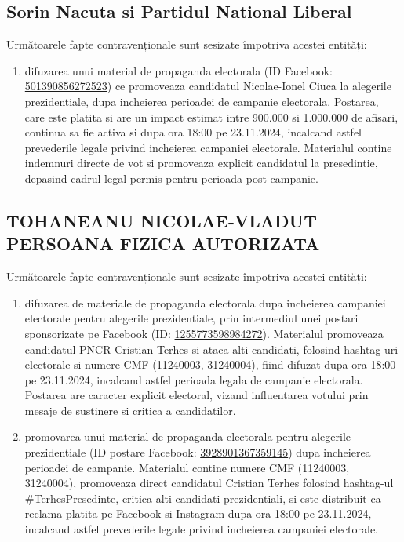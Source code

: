 \documentclass[a4paper,12pt]{article}
\begin{document}
\vspace{0.5cm}

\subsection{Sorin Nacuta si Partidul National Liberal}
Următoarele fapte contravenționale sunt sesizate împotriva acestei entități:

\begin{enumerate}[leftmargin=*, label=\arabic*.)]
    \item difuzarea unui material de propaganda electorala (ID Facebook: \href{https://www.facebook.com/ads/library/?id=501390856272523}{501390856272523}) ce promoveaza candidatul Nicolae-Ionel Ciuca la alegerile prezidentiale, dupa incheierea perioadei de campanie electorala. Postarea, care este platita si are un impact estimat intre 900.000 si 1.000.000 de afisari, continua sa fie activa si dupa ora 18:00 pe 23.11.2024, incalcand astfel prevederile legale privind incheierea campaniei electorale. Materialul contine indemnuri directe de vot si promoveaza explicit candidatul la presedintie, depasind cadrul legal permis pentru perioada post-campanie.
\end{enumerate}

\vspace{0.5cm}

\subsection{TOHANEANU NICOLAE-VLADUT PERSOANA FIZICA AUTORIZATA}
Următoarele fapte contravenționale sunt sesizate împotriva acestei entități:

\begin{enumerate}[leftmargin=*, label=\arabic*.)]
    \item difuzarea de materiale de propaganda electorala dupa incheierea campaniei electorale pentru alegerile prezidentiale, prin intermediul unei postari sponsorizate pe Facebook (ID: \href{https://www.facebook.com/ads/library/?id=1255773598984272}{1255773598984272}). Materialul promoveaza candidatul PNCR Cristian Terhes si ataca alti candidati, folosind hashtag-uri electorale si numere CMF (11240003, 31240004), fiind difuzat dupa ora 18:00 pe 23.11.2024, incalcand astfel perioada legala de campanie electorala. Postarea are caracter explicit electoral, vizand influentarea votului prin mesaje de sustinere si critica a candidatilor.
    \item promovarea unui material de propaganda electorala pentru alegerile prezidentiale (ID postare Facebook: \href{https://www.facebook.com/ads/library/?id=3928901367359145}{3928901367359145}) dupa incheierea perioadei de campanie. Materialul contine numere CMF (11240003, 31240004), promoveaza direct candidatul Cristian Terhes folosind hashtag-ul \#TerhesPresedinte, critica alti candidati prezidentiali, si este distribuit ca reclama platita pe Facebook si Instagram dupa ora 18:00 pe 23.11.2024, incalcand astfel prevederile legale privind incheierea campaniei electorale.
\end{enumerate}
\end{document}
